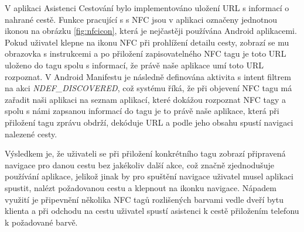 \documentclass[czech,master,public,dept460,male,java,cpdeclaration]{diploma}
\begin{document}
V aplikaci Asistenci Cestování bylo implementováno uložení URL s informací o nahrané cestě. Funkce
pracující s s NFC jsou v aplikaci označeny jednotnou ikonou na obrázku \ref{fig:nfcicon},
která je nejčastěji používána Android aplikacemi.
 Pokud uživatel klepne na ikonu NFC při prohlížení detailu cesty, zobrazí se mu obrazovka s instrukcemi a po přiložení
zapisovatelného NFC tagu je toto URL uloženo do tagu spolu s informací, že právě naše aplikace umí toto URL
rozpoznat. V Android Manifestu je následně definována aktivita s intent filtrem na akci \textit{NDEF\_DISCOVERED},
což systému říká, že při objevení NFC tagu má zařadit naši aplikaci na seznam aplikací, které dokážou
rozpoznat NFC tagy a spolu s námi zapsanou informací do tagu je to právě naše aplikace, která při přiložení
tagu zprávu obdrží, dekóduje URL a podle jeho obsahu spustí navigaci nalezené cesty.

Výsledkem je, že uživateli se při přiložení konkrétního tagu zobrazí připravená navigace pro danou
cestu bez jakékoliv další akce, což značně zjednodušuje používání aplikace, jelikož jinak by pro spuštění navigace
uživatel musel aplikaci spustit, nalézt požadovanou cestu a klepnout na ikonku navigace. Nápadem
 využití je připevnění několika NFC tagů rozlišených barvami vedle dveří bytu klienta a při odchodu na
 cestu uživatel spustí asistenci k cestě přiložením telefonu k požadované barvě.
\end{document}
